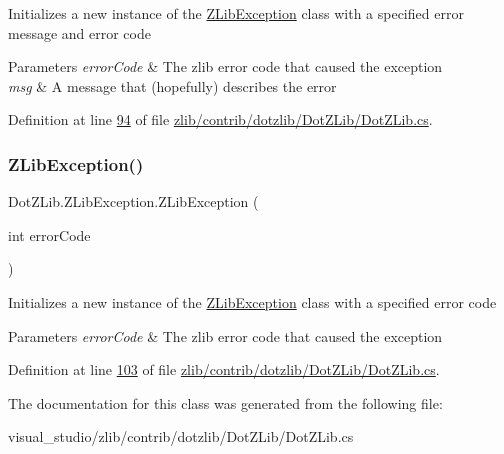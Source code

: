 Initializes a new instance of the \hyperlink{class_dot_z_lib_1_1_z_lib_exception}{Z\+Lib\+Exception} class with a specified error message and error code 


\begin{DoxyParams}{Parameters}
{\em error\+Code} & The zlib error code that caused the exception\\
\hline
{\em msg} & A message that (hopefully) describes the error\\
\hline
\end{DoxyParams}


Definition at line \hyperlink{zlib_2contrib_2dotzlib_2_dot_z_lib_2_dot_z_lib_8cs_source_l00094}{94} of file \hyperlink{zlib_2contrib_2dotzlib_2_dot_z_lib_2_dot_z_lib_8cs_source}{zlib/contrib/dotzlib/\+Dot\+Z\+Lib/\+Dot\+Z\+Lib.\+cs}.

\mbox{\label{class_dot_z_lib_1_1_z_lib_exception_af8dd9c725ef7bd7b2d2042e827ce9fb7}} 
\subsubsection{\texorpdfstring{Z\+Lib\+Exception()}{ZLibException()}\hspace{0.1cm}{\footnotesize\ttfamily [4/4]}}
{\footnotesize\ttfamily Dot\+Z\+Lib.\+Z\+Lib\+Exception.\+Z\+Lib\+Exception (\begin{DoxyParamCaption}\item[{int}]{error\+Code }\end{DoxyParamCaption})\hspace{0.3cm}{\ttfamily [inline]}}



Initializes a new instance of the \hyperlink{class_dot_z_lib_1_1_z_lib_exception}{Z\+Lib\+Exception} class with a specified error code 


\begin{DoxyParams}{Parameters}
{\em error\+Code} & The zlib error code that caused the exception\\
\hline
\end{DoxyParams}


Definition at line \hyperlink{zlib_2contrib_2dotzlib_2_dot_z_lib_2_dot_z_lib_8cs_source_l00103}{103} of file \hyperlink{zlib_2contrib_2dotzlib_2_dot_z_lib_2_dot_z_lib_8cs_source}{zlib/contrib/dotzlib/\+Dot\+Z\+Lib/\+Dot\+Z\+Lib.\+cs}.



The documentation for this class was generated from the following file\+:\begin{DoxyCompactItemize}
\item 
visual\+\_\+studio/zlib/contrib/dotzlib/\+Dot\+Z\+Lib/\+Dot\+Z\+Lib.\+cs\end{DoxyCompactItemize}
